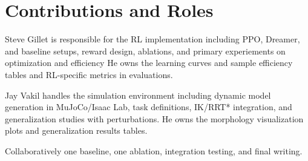\documentclass[conference]{IEEEtran}
\begin{document}
\section{Contributions and Roles}
Steve Gillet is responsible for the RL implementation including PPO, Dreamer, and baseline setups, reward design, ablations, and primary experiements on optimization and efficiency
He owns the learning curves and sample efficiency tables and RL-specific metrics in evaluations.

Jay Vakil handles the simulation environment including dynamic model generation in MuJoCo/Isaac Lab, task definitions, IK/RRT* integration, and generalization studies with perturbations.
He owns the morphology visualization plots and generalization results tables.

Collaboratively one baseline, one ablation, integration testing, and final writing.



\end{document}
